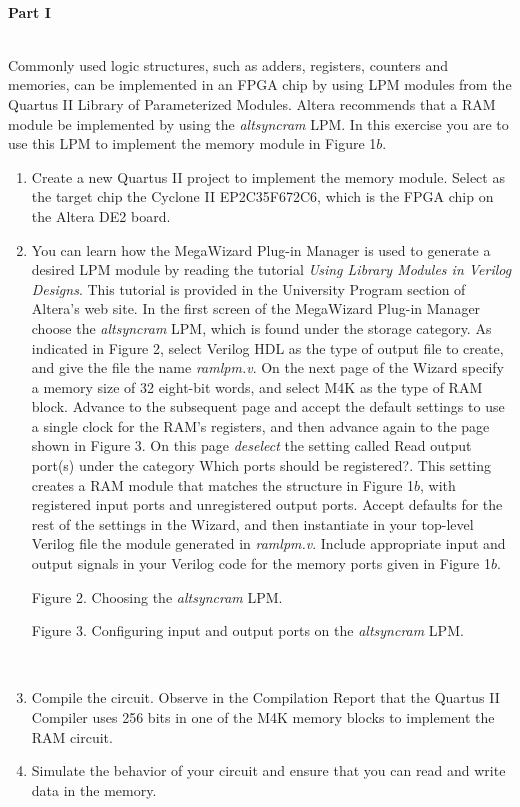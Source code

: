 \documentclass[psfig,10pt,fullpage]{article}
\begin{document}
~\\
\noindent
{\bf Part I}

~\\
\noindent
Commonly used logic structures, such as adders, registers, counters and memories, 
can be implemented in an FPGA chip by using LPM modules from the Quartus II
Library of Parameterized Modules. Altera recommends that a 
RAM module be implemented by using the {\it altsyncram} LPM. In this exercise you are to
use this LPM to implement the memory module in Figure 1$b$.

\begin{enumerate}
\item Create a new Quartus II project to implement the memory module.
Select as the target chip the Cyclone II EP2C35F672C6, which is the FPGA chip on the 
Altera DE2 board.

\item You can learn how the MegaWizard Plug-in Manager is used to generate a desired 
LPM module by reading the tutorial {\it Using Library Modules in Verilog Designs}. This 
tutorial is provided in the University Program section of Altera's web site.
In the first screen of the MegaWizard Plug-in Manager choose the 
{\it altsyncram} LPM, which is found under the {\sf storage} category. As indicated in Figure 2,
select {\sf Verilog HDL} as the type of output file to create, and give the file the
name {\it ramlpm.v}. On the next page of the Wizard specify a memory size of 32 eight-bit 
words, and select M4K as the type of RAM block. Advance to the subsequent page and
accept the default settings to use a single clock for the RAM's registers, 
and then advance again to 
the page shown in Figure 3. On this page {\it deselect} the setting called {\sf Read
output port(s)} under the category {\sf Which ports should be registered?}. This setting
creates a RAM module that matches the structure in Figure 1$b$, with registered input
ports and unregistered output ports. Accept defaults for the rest of the settings in the
Wizard, and then instantiate in your top-level Verilog file the module generated in 
{\it ramlpm.v}. Include appropriate input and output signals in your Verilog code for the
memory ports given in Figure 1$b$.

\begin{figure}[H]
\scriptsize
\centerline{
\hbox{}}
\end{figure}
\centerline{Figure 2.  Choosing the {\it altsyncram} LPM.}

\begin{figure}[H]
\scriptsize
\centerline{
\hbox{}}
\end{figure}
\centerline{Figure 3.  Configuring input and output ports on the {\it altsyncram} LPM.}
~\\
\item Compile the circuit. Observe in the Compilation Report that the Quartus II 
Compiler uses 256 bits in one of the M4K memory blocks to implement the RAM circuit.
\item Simulate the behavior of your circuit and ensure that you can read and write data in
the memory.
\end{enumerate}
\end{document}
